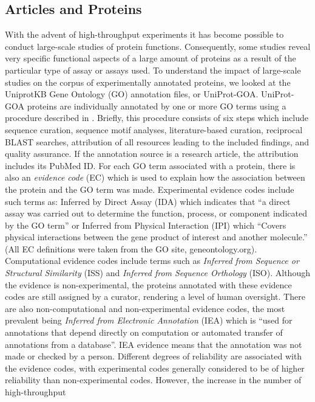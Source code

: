\documentclass[12pt]{article}
\begin{document}
\subsection*{Articles and Proteins} With the advent of high-throughput experiments it has become
possible to conduct large-scale studies of protein functions.  Consequently, some studies reveal
very specific functional aspects of a large amount of proteins as a result of the particular type
of assay or assays used. To understand the impact of large-scale studies on the corpus of
experimentally annotated proteins, we looked at the UniprotKB Gene Ontology (GO) annotation files,
or UniProt-GOA. UniProt-GOA proteins are individually annotated by one or more GO terms using a
procedure described in \cite{Dimmer2012UniProtGO}. Briefly, this procedure consists of six steps
which include sequence curation, sequence motif analyses, literature-based curation, reciprocal
BLAST\cite{Altschul1997Gapped} searches, attribution of all resources leading to the included
findings, and quality assurance. If the annotation source is a research article, the attribution
includes its PubMed ID. For each GO term associated with a protein, there is also an
\textit{evidence code} (EC) which is used to explain how the association between the protein and
the GO term was made.  Experimental evidence codes include such terms as: Inferred by Direct Assay
(IDA) which indicates that ``a direct assay was carried out to determine the function, process, or
component indicated by the GO term'' or Inferred from Physical Interaction (IPI) which ``Covers
physical interactions between the gene product of interest and another molecule.'' (All EC
definitions were taken from the GO site, geneontology.org).  Computational evidence codes include
terms such as \textit{Inferred from Sequence or Structural Similarity} (ISS) and \textit{Inferred
from Sequence Orthology} (ISO).  Although the evidence is non-experimental, the proteins annotated
with these evidence codes are still assigned by a curator, rendering a level of human oversight.
There are also non-computational and non-experimental evidence codes, the most prevalent being
\textit{Inferred from Electronic Annotation} (IEA) which is ``used for annotations that depend
directly on computation or automated transfer of annotations from a database''. IEA evidence means
that the annotation was not made or checked by a person.  Different degrees of reliability are
associated with the evidence codes, with experimental codes generally considered to be of higher
reliability than non-experimental codes.  However, the increase in the number of high-throughput
\end{document}
